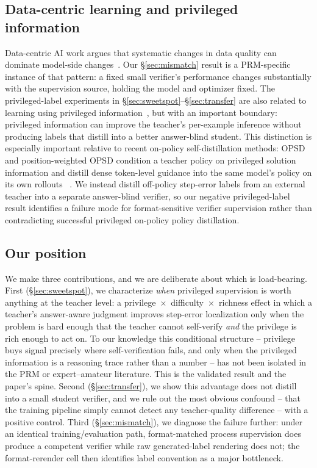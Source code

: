 \documentclass[11pt]{article}
\begin{document}
\subsection{Data-centric learning and privileged information}
Data-centric AI work argues that systematic changes in data quality can
dominate model-side changes~\cite{mazumder2022dataperf}. Our
\S\ref{sec:mismatch} result is a PRM-specific instance of that pattern: a
fixed small verifier's performance changes substantially with the
supervision source, holding the model and optimizer fixed. The
privileged-label experiments in \S\ref{sec:sweetspot}--\S\ref{sec:transfer}
are also related to learning using privileged
information~\cite{vapnik2009privileged}, but with an important boundary:
privileged information can improve the teacher's per-example inference
without producing labels that distill into a better answer-blind student.
This distinction is especially important relative to recent on-policy
self-distillation methods: OPSD and position-weighted OPSD condition a
teacher policy on privileged solution information and distill dense token-level
guidance into the same model's policy on its own rollouts
~\cite{zhao2026opsd,liu2026pwopsd}. We instead distill off-policy
step-error labels from an external teacher into a separate answer-blind
verifier, so our negative privileged-label result identifies a failure mode for
format-sensitive verifier supervision rather than contradicting successful
privileged on-policy policy distillation.

\subsection{Our position}
We make three contributions, and we are deliberate about which is
load-bearing. First (\S\ref{sec:sweetspot}), we characterize \emph{when}
privileged supervision is worth anything at the teacher level: a
privilege~$\times$~difficulty~$\times$~richness effect in which a teacher's
answer-aware judgment improves step-error localization only when the problem
is hard enough that the teacher cannot self-verify \emph{and} the privilege
is rich enough to act on. To our knowledge this conditional structure --
privilege buys signal precisely where self-verification fails, and only when
the privileged information is a reasoning trace rather than a number -- has
not been isolated in the PRM or expert--amateur literature. This is the
validated result and the paper's spine. Second (\S\ref{sec:transfer}), we
show this advantage does not distill into a small student verifier, and we
rule out the most obvious confound -- that the training pipeline simply
cannot detect any teacher-quality difference -- with a positive control.
Third (\S\ref{sec:mismatch}), we diagnose the failure further: under an
identical training/evaluation path, format-matched process supervision does
produce a competent verifier while raw generated-label rendering does not; the
format-rerender cell then identifies label convention as a major bottleneck.
\end{document}
